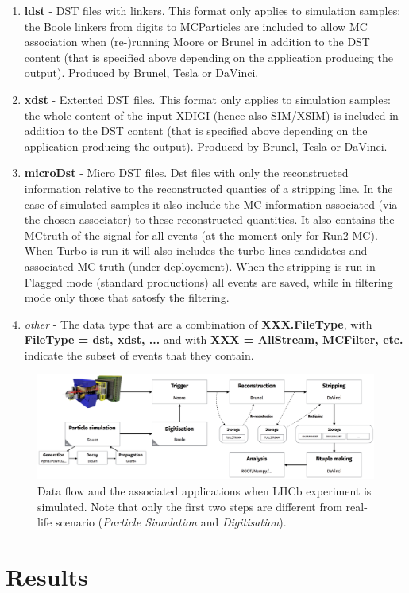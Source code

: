 \documentclass[11pt,a4paper,twoside]{article}
\begin{document}
\begin{enumerate}
\begin{enumerate}
        \item \textbf{ldst} - DST files with linkers. This format only applies to simulation samples: the Boole linkers from digits to MCParticles are included to allow MC association when (re-)running Moore or Brunel in addition to the DST content (that is specified above depending on the application producing the output). Produced by Brunel, Tesla or DaVinci.

        \item \textbf{xdst} - Extented DST files. This format only applies to simulation samples: the whole content of the input XDIGI (hence also SIM/XSIM) is included in addition to the DST content (that is specified above depending on the application producing the output). Produced by Brunel, Tesla or DaVinci.

        \item \textbf{microDst} - Micro DST files. Dst files with only the reconstructed information relative to the reconstructed quanties of a stripping line. In the case of simulated samples it also include the MC information associated (via the chosen associator) to these reconstructed quantities. It also contains the MCtruth of the signal for all events (at the moment only for Run2 MC). When Turbo is run it will also includes the turbo lines candidates and associated MC truth (under deployement). When the stripping is run in Flagged mode (standard productions) all events are saved, while in filtering mode only those that satosfy the filtering.

        \item \textit{other} - The data type that are a combination of \textbf{XXX.FileType}, with \textbf{FileType = dst, xdst, ...} and with \textbf{XXX = AllStream, MCFilter, etc.} indicate the subset of events that they contain.
    \end{enumerate}

    \begin{figure}[H]
        \centering

        \includegraphics[width=\textwidth]{visuals/009-lhcb_data_flow.png}
        
        \caption{Data flow and the associated applications when LHCb experiment is simulated\cite{LHCb-STARTERKIT-DATAFLOW}. Note that only the first two steps are different from real-life scenario (\textit{Particle Simulation} and \textit{Digitisation}).}
        \label{fig:009-RICH1-simulation}
    \end{figure}

    
        
    \end{enumerate}


\section{Results}
    
\singlespacing
	
	


	
\end{document}
